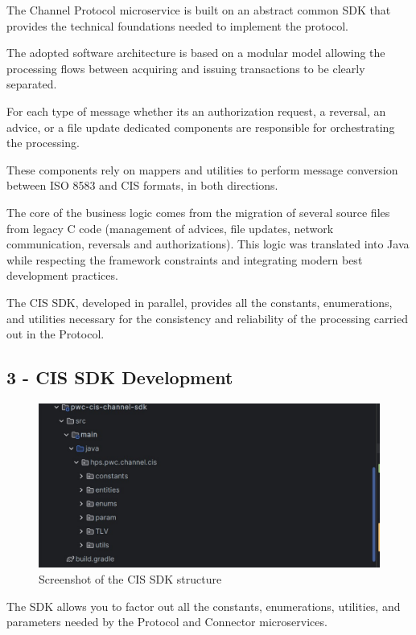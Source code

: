\documentclass[12pt,a4paper]{report}
\begin{document}
The Channel Protocol microservice is built on an abstract common SDK
that provides the technical foundations needed to implement the
protocol.

The adopted software architecture is based on a modular model allowing
the processing flows between acquiring and issuing transactions to be
clearly separated.

For each type of message whether it\textquotesingle s an authorization
request, a reversal, an advice, or a file update dedicated components
are responsible for orchestrating the processing.

These components rely on mappers and utilities to perform message
conversion between ISO 8583 and CIS formats, in both directions.

The core of the business logic comes from the migration of several
source files from legacy C code (management of advices, file updates,
network communication, reversals and authorizations). This logic was
translated into Java while respecting the framework constraints and
integrating modern best development practices.

The CIS SDK, developed in parallel, provides all the constants,
enumerations, and utilities necessary for the consistency and
reliability of the processing carried out in the Protocol.


\subsection{3 - CIS SDK Development}
\begin{figure}[H]
\centering
\includegraphics[width=\textwidth,height=\textheight,keepaspectratio]{media/image65.jpg}
\caption{Screenshot of the CIS SDK structure}
\label{fig:CSS}
\end{figure} 


The SDK allows you to factor out all the constants, enumerations,
utilities, and parameters needed by the Protocol and Connector
microservices.
\end{document}

